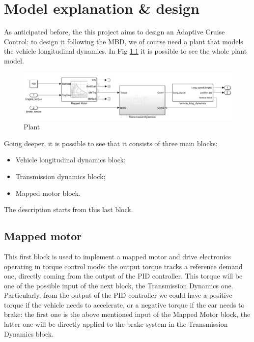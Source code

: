 \documentclass[12pt,a4paper]{report}
\begin{document}
\chapter{Model explanation \& design}
As anticipated before, the this project aims to design an Adaptive Cruise Control: to design it following the MBD, we of course need a plant that models the vehicle longitudinal dynamics.
In Fig \ref{Plant} it is possible to see the whole plant model.

\begin{figure}[htbp]
	\centering
	\includegraphics[scale=0.5]{Plant.jpg}
	\caption{Plant}
	\label{Plant}
\end{figure}


Going deeper, it is possible to see that it consists of three main blocks:

\begin{itemize}
	
	\item Vehicle longitudinal dynamics block;
	
	\item Transmission dynamics block;
	
	\item Mapped motor block.
	
\end{itemize}

The description starts from this last block.

\section{Mapped motor}

This first block is used to implement a mapped motor and drive electronics operating in torque control mode: the output torque tracks a reference demand one, directly coming from the output of the PID controller. This torque will be one of the possible input of the next block, the Transmission Dynamics one. Particularly, from the output of the PID controller we could have a positive torque if the vehicle needs to accelerate, or a negative torque if the car needs to brake: the first one is the above mentioned input of the Mapped Motor block, the latter one will be directly applied to the brake system in the Transmission Dynamics block.
\end{document}
